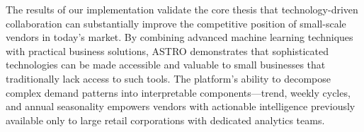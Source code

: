 \par The results of our implementation validate the core thesis that technology-driven collaboration can substantially improve the competitive position of small-scale vendors in today's market. By combining advanced machine learning techniques with practical business solutions, ASTRO demonstrates that sophisticated technologies can be made accessible and valuable to small businesses that traditionally lack access to such tools. The platform's ability to decompose complex demand patterns into interpretable components—trend, weekly cycles, and annual seasonality empowers vendors with actionable intelligence previously available only to large retail corporations with dedicated analytics teams.
